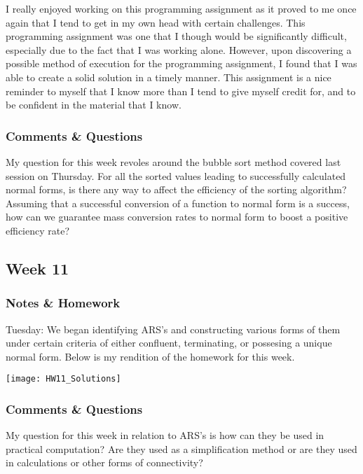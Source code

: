 \documentclass{article}
\theoremstyle{theorem}
\theoremstyle{definition}
\theoremstyle{remark}
\begin{document}
  I really enjoyed working on this programming assignment as it proved to me once again that I tend to get in my own head with certain challenges. This programming assignment was one that I though would be significantly difficult, especially due to the fact that I was working alone. However, upon discovering a possible method of execution for the programming assignment, I found that I was able to create a solid solution in a timely manner. This assignment is a nice reminder to myself that I know more than I tend to give myself credit for, and to be confident in the material that I know.

  \subsubsection{Comments \& Questions}

  My question for this week revoles around the bubble sort method covered last session on Thursday. For all the sorted values leading to successfully calculated normal forms, is there any way to affect the efficiency of the sorting algorithm? Assuming that a successful conversion of a function to normal form is a success, how can we guarantee mass conversion rates to normal form to boost a positive efficiency rate?

  \subsection{Week 11}

  \subsubsection{Notes \& Homework}

  Tuesday: We began identifying ARS's and constructing various forms of them under certain criteria of either confluent, terminating, or possesing a unique normal form. Below is my rendition of the homework for this week.

  \graphicspath{ {C:/Users/jrmul/OneDrive/Documents/CPSC_Courses/CPSC_354/images/} }
  \begin{center} \texttt{[image: HW11\_Solutions]} \end{center}

  \subsubsection{Comments \& Questions}

  My question for this week in relation to ARS's is how can they be used in practical computation? Are they used as a simplification method or are they used in calculations or other forms of connectivity? 
\end{document}
